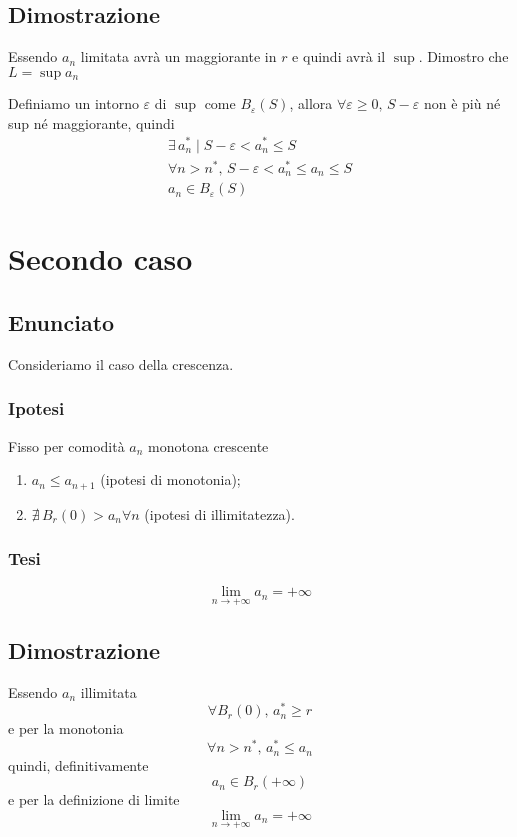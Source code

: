 \documentclass[../../dimostrazioni]{subfiles}
\begin{document}
            \subsection*{Dimostrazione}
                Essendo \(a_n\) limitata avrà un maggiorante in \(r\) e quindi avrà il \(\sup\).
                Dimostro che \(L = \sup{a_n}\)

                Definiamo un intorno \(\varepsilon\) di \(\sup\) come \(B_\varepsilon (S)\), allora
                \(\forall \varepsilon \geqslant 0, \, S-\varepsilon\) non è più né sup né maggiorante, quindi
                \begin{gather*}
                    \exists \, a_n^* \mid S-\varepsilon < a_n^* \leqslant S \\
                    \forall n > n^*, \, S-\varepsilon < a_n^* \leqslant a_n \leqslant S \\
                    a_n \in B_\varepsilon(S) 
                \end{gather*}
                
        \newpage

        \section*{Secondo caso}

            \subsection*{Enunciato}

            Consideriamo il caso della crescenza.
                
            \subsubsection*{Ipotesi}
                 
            Fisso per comodità \(a_n\) monotona crescente

            \begin{enumerate}
               \indentitem \item \(a_n \leqslant a_{n+1}\) (ipotesi di monotonia);
               \indentitem \item \(\nexists \, B_r(0) > {a_n} \forall n \) (ipotesi di illimitatezza).
            \end{enumerate}
        
            \subsubsection*{Tesi}
                \[\lim_{n \to +\infty} a_n = +\infty\]
    
        \subsection*{Dimostrazione}
            Essendo \(a_n\) illimitata 
            \[\forall B_r(0), \, a_n^* \geqslant r \]
            e per la monotonia
            \[\forall n > n^*, \, a_n^* \leqslant a_n\]
            quindi, definitivamente
            \[a_n \in B_r(+\infty)\]
            e per la definizione di limite 
            \[\lim_{n \to +\infty} a_n = +\infty\]
\end{document}
